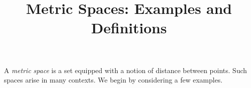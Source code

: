 \documentclass{amsart}
\begin{document}
 
 \title{Metric Spaces: Examples and Definitions}
 
 \maketitle
 
 A \emph{metric space} is a set equipped with a notion of distance between points. Such
spaces arise in many contexts. We begin by considering a few examples.
 
\end{document}
